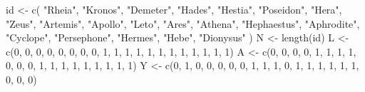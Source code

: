 \documentclass[
  10pt,
]{book}
\newenvironment{Shaded}{\begin{snugshade}}{\end{snugshade}}
\newcommand{\DecValTok}[1]{\textcolor[rgb]{0.00,0.00,0.81}{#1}}
\newcommand{\FunctionTok}[1]{\textcolor[rgb]{0.00,0.00,0.00}{#1}}
\newcommand{\NormalTok}[1]{#1}
\newcommand{\OtherTok}[1]{\textcolor[rgb]{0.56,0.35,0.01}{#1}}
\newcommand{\StringTok}[1]{\textcolor[rgb]{0.31,0.60,0.02}{#1}}
\begin{document}
\begin{Shaded}
\begin{Highlighting}[]
\NormalTok{id }\OtherTok{\textless{}{-}} \FunctionTok{c}\NormalTok{(}
  \StringTok{"Rheia"}\NormalTok{,}
  \StringTok{"Kronos"}\NormalTok{,}
  \StringTok{"Demeter"}\NormalTok{,}
  \StringTok{"Hades"}\NormalTok{,}
  \StringTok{"Hestia"}\NormalTok{,}
  \StringTok{"Poseidon"}\NormalTok{,}
  \StringTok{"Hera"}\NormalTok{,}
  \StringTok{"Zeus"}\NormalTok{,}
  \StringTok{"Artemis"}\NormalTok{,}
  \StringTok{"Apollo"}\NormalTok{,}
  \StringTok{"Leto"}\NormalTok{,}
  \StringTok{"Ares"}\NormalTok{,}
  \StringTok{"Athena"}\NormalTok{,}
  \StringTok{"Hephaestus"}\NormalTok{,}
  \StringTok{"Aphrodite"}\NormalTok{,}
  \StringTok{"Cyclope"}\NormalTok{,}
  \StringTok{"Persephone"}\NormalTok{,}
  \StringTok{"Hermes"}\NormalTok{,}
  \StringTok{"Hebe"}\NormalTok{,}
  \StringTok{"Dionysus"}
\NormalTok{)}
\NormalTok{N }\OtherTok{\textless{}{-}} \FunctionTok{length}\NormalTok{(id)}
\NormalTok{L }\OtherTok{\textless{}{-}} \FunctionTok{c}\NormalTok{(}\DecValTok{0}\NormalTok{, }\DecValTok{0}\NormalTok{, }\DecValTok{0}\NormalTok{, }\DecValTok{0}\NormalTok{, }\DecValTok{0}\NormalTok{, }\DecValTok{0}\NormalTok{, }\DecValTok{0}\NormalTok{, }\DecValTok{0}\NormalTok{, }\DecValTok{1}\NormalTok{, }\DecValTok{1}\NormalTok{, }\DecValTok{1}\NormalTok{, }\DecValTok{1}\NormalTok{, }\DecValTok{1}\NormalTok{, }\DecValTok{1}\NormalTok{, }\DecValTok{1}\NormalTok{, }\DecValTok{1}\NormalTok{, }\DecValTok{1}\NormalTok{, }\DecValTok{1}\NormalTok{, }\DecValTok{1}\NormalTok{, }\DecValTok{1}\NormalTok{)}
\NormalTok{A }\OtherTok{\textless{}{-}} \FunctionTok{c}\NormalTok{(}\DecValTok{0}\NormalTok{, }\DecValTok{0}\NormalTok{, }\DecValTok{0}\NormalTok{, }\DecValTok{0}\NormalTok{, }\DecValTok{1}\NormalTok{, }\DecValTok{1}\NormalTok{, }\DecValTok{1}\NormalTok{, }\DecValTok{1}\NormalTok{, }\DecValTok{0}\NormalTok{, }\DecValTok{0}\NormalTok{, }\DecValTok{0}\NormalTok{, }\DecValTok{1}\NormalTok{, }\DecValTok{1}\NormalTok{, }\DecValTok{1}\NormalTok{, }\DecValTok{1}\NormalTok{, }\DecValTok{1}\NormalTok{, }\DecValTok{1}\NormalTok{, }\DecValTok{1}\NormalTok{, }\DecValTok{1}\NormalTok{, }\DecValTok{1}\NormalTok{)}
\NormalTok{Y }\OtherTok{\textless{}{-}} \FunctionTok{c}\NormalTok{(}\DecValTok{0}\NormalTok{, }\DecValTok{1}\NormalTok{, }\DecValTok{0}\NormalTok{, }\DecValTok{0}\NormalTok{, }\DecValTok{0}\NormalTok{, }\DecValTok{0}\NormalTok{, }\DecValTok{0}\NormalTok{, }\DecValTok{1}\NormalTok{, }\DecValTok{1}\NormalTok{, }\DecValTok{1}\NormalTok{, }\DecValTok{0}\NormalTok{, }\DecValTok{1}\NormalTok{, }\DecValTok{1}\NormalTok{, }\DecValTok{1}\NormalTok{, }\DecValTok{1}\NormalTok{, }\DecValTok{1}\NormalTok{, }\DecValTok{1}\NormalTok{, }\DecValTok{0}\NormalTok{, }\DecValTok{0}\NormalTok{, }\DecValTok{0}\NormalTok{)}

\end{Highlighting}
\end{Shaded}
\end{document}
